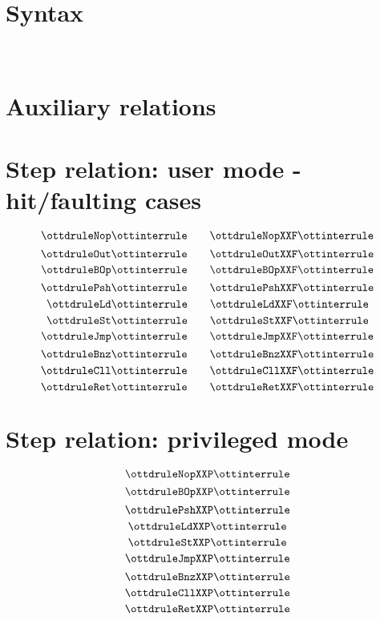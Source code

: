 \documentclass{article}
\begin{document}
\section*{Syntax}

\ottmetavars\\[3ex]

\ottgrammartabular{
\ottn\ottinterrule
\ottb\ottinterrule
\ottL\ottinterrule
\ottC\ottinterrule
\otta\ottinterrule
\ottinstr\ottinterrule
\ottS\ottinterrule
}

\section*{Auxiliary relations}

\ottgrammartabular{
\ottformula\ottinterrule
}

\section*{Step relation: user mode - hit/faulting cases}

\begin{small}
\[ \ottdruleNop \ottinterrule 
   \quad \quad \ottdruleNopXXF \ottinterrule \]
\[ \ottdruleOut \ottinterrule
   \quad \quad  \ottdruleOutXXF \ottinterrule \]
\[ \ottdruleBOp \ottinterrule
   \quad \quad \ottdruleBOpXXF \ottinterrule \]
\[ \ottdrulePsh \ottinterrule 
   \quad \quad \ottdrulePshXXF \ottinterrule \]
 \[ \ottdruleLd \ottinterrule 
   \quad \quad \ottdruleLdXXF \ottinterrule \]
\[ \ottdruleSt \ottinterrule
   \quad \quad \ottdruleStXXF \ottinterrule \]
\[ \ottdruleJmp \ottinterrule
   \quad \quad \ottdruleJmpXXF \ottinterrule \]
\[ \ottdruleBnz \ottinterrule 
   \quad \quad  \ottdruleBnzXXF \ottinterrule  \] 
\[ \ottdruleCll \ottinterrule
   \quad \quad  \ottdruleCllXXF \ottinterrule \]
\[ \ottdruleRet \ottinterrule   
   \quad \quad  \ottdruleRetXXF \ottinterrule \]
\end{small}

\section{Step relation: privileged mode}

\[ \ottdruleNopXXP \ottinterrule \]
\[ \ottdruleBOpXXP \ottinterrule \]
\[ \ottdrulePshXXP \ottinterrule \]
\[ \ottdruleLdXXP \ottinterrule \]
\[ \ottdruleStXXP \ottinterrule \]
\[ \ottdruleJmpXXP \ottinterrule \]
\[ \ottdruleBnzXXP \ottinterrule \] 
\[ \ottdruleCllXXP \ottinterrule \]
\[ \ottdruleRetXXP \ottinterrule \] 


\end{document}
